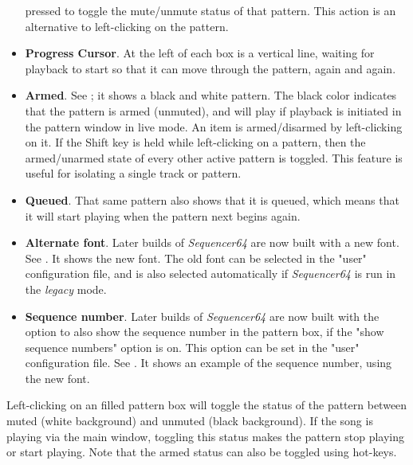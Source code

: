 \begin{itemize}
         pressed to toggle the mute/unmute status of that pattern.
         This action is an alternative to left-clicking on the pattern.
      \item \textbf{Progress Cursor}.
         At the left of each box is a vertical line, waiting for playback to
         start so that it can move through the pattern, again and again.
      \item \textbf{Armed}.
         See ; it shows a black
         and white pattern.  The black color indicates that the pattern is armed
         (unmuted), and will play if playback is initiated in the pattern
         window in live mode.
         An item is armed/disarmed by left-clicking on it.
         If the Shift key is held while left-clicking on a pattern, then
         the armed/unarmed state of every other active pattern is toggled.
         This feature is useful for isolating a single track or pattern.
      \item \textbf{Queued}.
         That same pattern also shows that it is queued, which means that it
         will start playing when the pattern next begins again.
      \item \textbf{Alternate font}.
         Later builds of \textsl{Sequencer64} are now built with a new font.
         See .  It shows the new
         font. 
         The old font can be selected in the "user" configuration file, and is
         also selected automatically if \textsl{Sequencer64} is run in the
         \textsl{legacy} mode.
      \item \textbf{Sequence number}.
         Later builds of \textsl{Sequencer64} are now built with the option to
         also show the sequence number in the pattern box, if the "show
         sequence numbers" option is on.
         This option can be set in the "user" configuration file.
         See .  It shows an
         example of the sequence number, using the new font.
   \end{itemize}

   Left-clicking on an filled pattern box will toggle the status of the
   pattern between muted (white background) and unmuted (black background).
   If the song is playing via the main window, toggling this status makes
   the pattern stop playing or start playing.  Note that the armed status
   can also be toggled using hot-keys.

